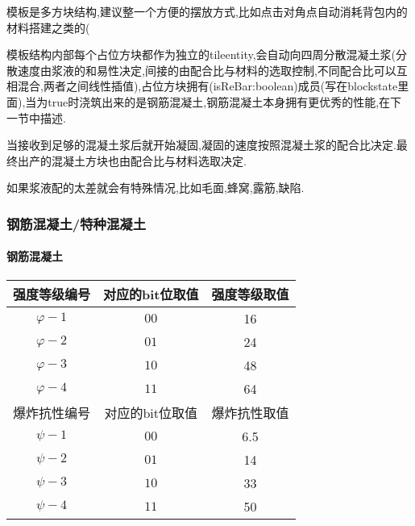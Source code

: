 {{{{              模板是多方块结构,建议整一个方便的摆放方式,比如点击对角点自动消耗背包内的材料搭建之类的(

              模板结构内部每个占位方块都作为独立的tileentity,会自动向四周分散混凝土浆(分散速度由浆液的和易性决定,间接的由配合比与材料的选取控制,不同配合比可以互相混合,两者之间线性插值),占位方块拥有(isReBar:boolean)成员(写在blockstate里面),当为true时浇筑出来的是钢筋混凝土,钢筋混凝土本身拥有更优秀的性能,在下一节中描述.

              当接收到足够的混凝土浆后就开始凝固,凝固的速度按照混凝土浆的配合比决定.最终出产的混凝土方块也由配合比与材料选取决定.

              如果浆液配的太差就会有特殊情况,比如毛面,蜂窝,露筋,缺陷.
          }
      }

      \subsubsection{钢筋混凝土/特种混凝土}{
          \paragraph{钢筋混凝土}{
              \begin{center}
                  \begin{tabular}{|c|c|c|}
                      \hline
                      强度等级编号 & 对应的bit位取值 & 强度等级取值 \\
                      \hline
                      $\varphi-1$  & $00$            & 16           \\
                      \hline
                      $\varphi-2$  & $01$            & 24           \\
                      \hline
                      $\varphi-3$  & $10$            & 48           \\
                      \hline
                      $\varphi-4$  & $11$            & 64           \\
                      \hline
                      爆炸抗性编号 & 对应的bit位取值 & 爆炸抗性取值 \\
                      \hline
                      $\psi-1$     & $00$            & 6.5          \\
                      \hline
                      $\psi-2$     & $01$            & 14           \\
                      \hline
                      $\psi-3$     & $10$            & 33           \\
                      \hline
                      $\psi-4$     & $11$            & 50           \\
                      \hline
                  \end{tabular}
              \end{center}
          }

}}}

